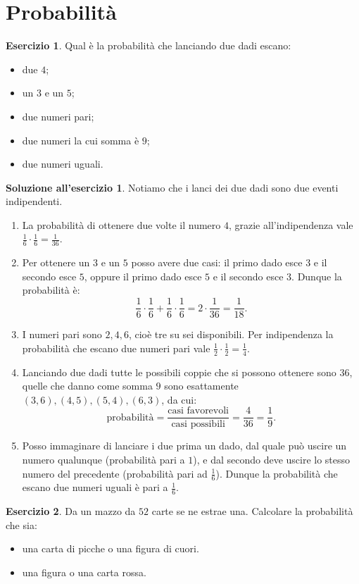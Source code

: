 \documentclass[12pt,a4paper]{article}
\theoremstyle{definition}
\newtheorem{sol}{Soluzione all'esercizio}
\newtheorem{exe}{Esercizio}
\begin{document}
\section{Probabilità}

\begin{exe}
	Qual è la probabilità che lanciando due dadi escano:
	\begin{itemize}
		\item due $ 4 $;
		\item un $ 3 $ e un $ 5 $;
		\item due numeri pari;
		\item due numeri la cui somma è $ 9 $;
		\item due numeri uguali.
	\end{itemize}
\end{exe}

\begin{sol}Notiamo che i lanci dei due dadi sono due eventi indipendenti.
	\begin{enumerate}
		\item La probabilità di ottenere due volte il numero $ 4 $, grazie all'indipendenza vale $ \frac16 \cdot \frac16 = \frac{1}{36}. $
		\item Per ottenere un $ 3 $ e un $ 5 $ posso avere due casi: il primo dado esce $ 3 $ e il secondo esce $ 5 $, oppure il primo dado esce $ 5 $ e il secondo esce $ 3 $. Dunque la probabilità è:
		      \[ \frac16 \cdot \frac16 + \frac16 \cdot \frac16 = 2\cdot \frac{1}{36} = \frac{1}{18}. \]
		\item I numeri pari sono $ 2, 4, 6 $, cioè tre su sei disponibili. Per indipendenza la probabilità che escano due numeri pari vale $ \frac12 \cdot \frac12 = \frac{1}{4}. $
		\item Lanciando due dadi tutte le possibili coppie che si possono ottenere sono $ 36 $, quelle che danno come somma $ 9 $ sono esattamente $ (3, 6), (4,5), (5,4), (6,3) $, da cui:
		      \[ \text{probabilità} = \frac{\text{casi favorevoli}}{\text{casi possibili}} = \frac{4}{36} = \frac19. \]
		\item Posso immaginare di lanciare i due prima un dado, dal quale può uscire un numero qualunque (probabilità pari a $ 1 $), e dal secondo deve uscire lo stesso numero del precedente (probabilità pari ad $ \frac16 $). Dunque la probabilità che escano due numeri uguali è pari a $ \frac16 $.
	\end{enumerate}
\end{sol}

\begin{exe}
	Da un mazzo da $ 52 $ carte se ne estrae una. Calcolare la probabilità che sia:
	\begin{itemize}
		\item una carta di picche o una figura di cuori.
		\item una figura o una carta rossa.
	\end{itemize}
\end{exe}
\end{document}
